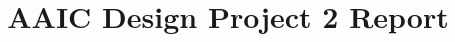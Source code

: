 \documentclass[a4paper,12pt]{article}
\title{AAIC Design Project 2 Report}
\begin{document}
\maketitle







\begin{appendices}

\end{appendices}

\nocite{*}


\end{document}
